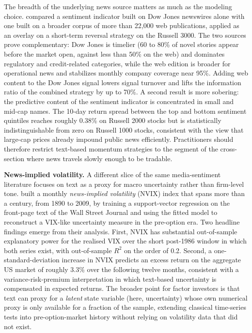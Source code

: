 The breadth of the underlying news source matters as much as the modeling choice. \cite{hafez2014web} compared a sentiment indicator built on Dow Jones newswires alone with one built on a broader corpus of more than 22,000 web publications, applied as an overlay on a short-term reversal strategy on the Russell 3000. The two sources prove complementary: Dow Jones is timelier (60 to 80\% of novel stories appear before the market open, against less than 50\% on the web) and dominates regulatory and credit-related categories, while the web edition is broader for operational news and stabilizes monthly company coverage near 95\%. Adding web content to the Dow Jones signal lowers signal turnover and lifts the information ratio of the combined strategy by up to 70\%. A second result is more sobering: the predictive content of the sentiment indicator is concentrated in small and mid-cap names. The 10-day return spread between the top and bottom sentiment quintiles reaches roughly 0.38\% on Russell 2000 stocks but is statistically indistinguishable from zero on Russell 1000 stocks, consistent with the view that large-cap prices already impound public news efficiently. Practitioners should therefore restrict text-based momentum strategies to the segment of the cross-section where news travels slowly enough to be tradable.

\textbf{News-implied volatility.} A different slice of the same media-sentiment literature focuses on text as a proxy for macro uncertainty rather than firm-level tone. \cite{manela2017news} built a monthly \textit{news-implied volatility} (NVIX) index that spans more than a century, from 1890 to 2009, by training a support-vector regression on the front-page text of the Wall Street Journal and using the fitted model to reconstruct a VIX-like uncertainty measure in the pre-option era. Two headline findings emerge from their analysis. First, NVIX has substantial out-of-sample explanatory power for the realised VIX over the short post-1986 window in which both series exist, with out-of-sample $R^2$ on the order of 0.2. Second, a one-standard-deviation increase in NVIX predicts an excess return on the aggregate US market of roughly 3.3\% over the following twelve months, consistent with a variance-risk-premium interpretation in which text-based uncertainty is compensated in expected returns. The broader point for factor investors is that text can proxy for a \textit{latent} state variable (here, uncertainty) whose own numerical proxy is only available for a fraction of the sample, extending classical time-series tests into pre-option-market history without relying on volatility data that did not exist.

